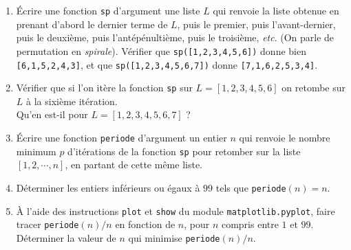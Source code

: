 \begin{exercice}
\begin{enumerate}
 \item Écrire une fonction \texttt{sp} d'argument une liste $L$ qui renvoie la liste obtenue en prenant d'abord le
dernier terme de $L$, puis le premier, puis l'avant-dernier, puis le deuxième, puis l'antépénultième,
puis le troisième, \textit{etc}. (On parle de permutation en \textit{spirale}). Vérifier que \texttt{sp([1,2,3,4,5,6])} donne
bien \texttt{[6,1,5,2,4,3]}, et que \texttt{sp([1,2,3,4,5,6,7])} donne \texttt{[7,1,6,2,5,3,4]}.
\item  Vérifier que si l'on itère la fonction \texttt{sp} sur $L = [1, 2, 3, 4, 5, 6]$ on retombe sur $L$ à la sixième itération.\\
Qu'en est-il pour $L = [1, 2, 3, 4, 5, 6, 7]$ ?
\item  Écrire une fonction \texttt{periode} d'argument un entier $n$ qui renvoie le nombre minimum $p$ d'itérations de la fonction \texttt{sp} pour retomber sur la liste $[1, 2,\cdots , n]$, en partant de cette même liste.
\item  Déterminer les entiers inférieurs ou égaux à $99$ tels que \texttt{periode}$(n) = n$.
\item  À l'aide des instructions \texttt{plot} et \texttt{show} du module \texttt{matplotlib.pyplot}, faire tracer \texttt{periode}$(n)/n$ en fonction de $n$, pour $n$ compris entre $1$ et $99$. Déterminer la valeur de $n$ qui minimise \texttt{periode}$(n)/n$.
\end{enumerate}
\end{exercice}



